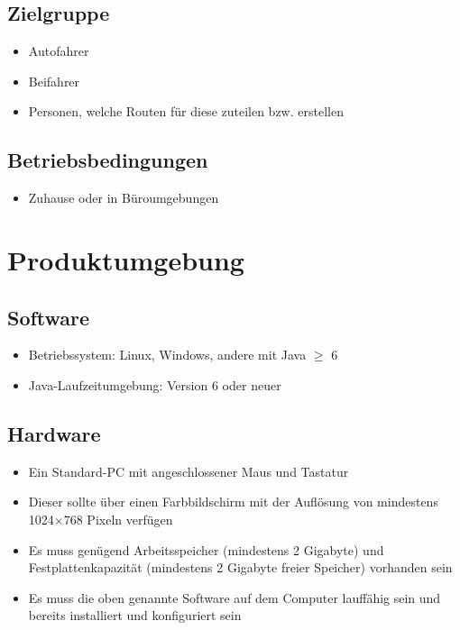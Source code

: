 \documentclass[a4paper, 11pt]{article}
\begin{document}
\subsection{Zielgruppe}
\begin{itemize}
\item Autofahrer
\item Beifahrer
\item Personen, welche Routen für diese zuteilen bzw. erstellen
\end{itemize}

\subsection{Betriebsbedingungen}
\begin{itemize}
\item Zuhause oder in Büroumgebungen
\end{itemize}

\section{Produktumgebung}

\subsection{Software}

\begin{itemize}
\item Betriebssystem: Linux, Windows, andere mit Java $\geq$ 6
\item Java-Laufzeitumgebung: Version 6 oder neuer
\end{itemize}

\subsection{Hardware}

\begin{itemize}
\item Ein Standard-PC mit angeschlossener Maus und Tastatur
\item Dieser sollte über einen Farbbildschirm mit der Auflösung von mindestens 1024$\times$768 Pixeln verfügen
\item Es muss genügend Arbeitsspeicher (mindestens 2 Gigabyte) und Festplattenkapazität (mindestens 2 Gigabyte freier Speicher) vorhanden sein
\item Es muss die oben genannte Software auf dem Computer lauffähig sein und bereits installiert und konfiguriert sein
\end{itemize}
\end{document}
